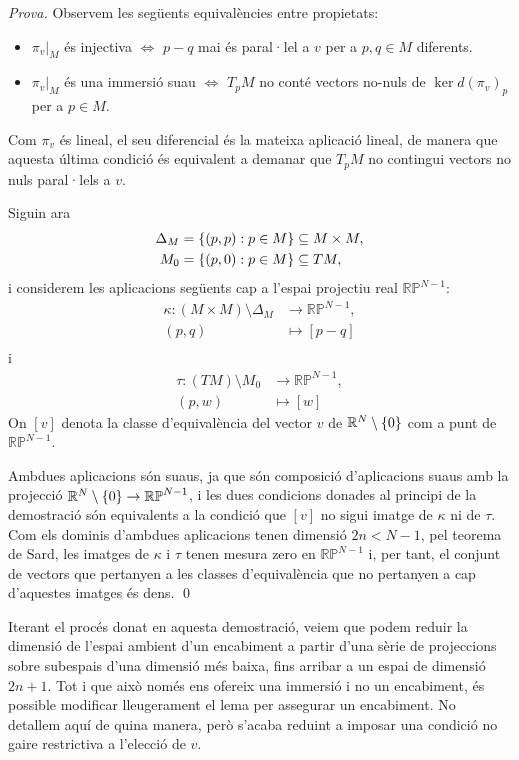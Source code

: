 {
    \color{green!50!black} 
    \textit{Prova.}
    Observem les següents equivalències entre propietats:
    \begin{itemize}
        \item $\pi_v|_M$ és injectiva $\iff$ $p-q$ mai és paral·lel a $v$ per a $p,q\in M$ diferents.
        \item $\pi_v|_M$ és una immersió suau $\iff$ $T_pM$ no conté vectors no-nuls de $\ker d(\pi_v)_p$ per a $p\in M$.
    \end{itemize}
    Com $\pi_v$ és lineal, el seu diferencial és la mateixa aplicació lineal, de manera que aquesta última condició és equivalent a demanar que $T_pM$ no contingui vectors no nuls paral·lels a $v$.

    Siguin ara
    \begin{align*}
        \Delta_M &= \{(p,p):p\in M\}\subseteq M\times M,\\
        M_0 &= \{(p,0):p\in M\}\subseteq TM,\\
    \end{align*}
    i considerem les aplicacions següents cap a l'espai projectiu real $\mathbb {RP}^{N-1}$:
    \begin{align*}
        \kappa:(M\times M)\setminus\Delta_M&\to\mathbb {RP}^{N-1},\\
        (p,q) &\mapsto [p-q]\\
    \end{align*}
    i
    \begin{align*}
        \tau:(TM)\setminus M_0&\to\mathbb {RP}^{N-1},\\
        (p,w) &\mapsto [w]
    \end{align*}
    On $[v]$ denota la classe d'equivalència del vector $v$ de $\mathbb R^N\setminus\{0\}$ com a punt de $\mathbb {RP}^{N-1}$.

    Ambdues aplicacions són suaus, ja que són composició d'aplicacions suaus amb la projecció $\mathbb R^N\setminus\{0\}\to\mathbb {RP}^{N-1}$, i les dues condicions donades al principi de la demostració són equivalents a la condició que $[v]$ no sigui imatge de $\kappa$ ni de $\tau$. Com els dominis d'ambdues aplicacions tenen dimensió $2n<N-1$, pel teorema de Sard, les imatges de $\kappa$ i $\tau$ tenen mesura zero en $\mathbb {RP}^{N-1}$ i, per tant, el conjunt de vectors que pertanyen a les classes d'equivalència que no pertanyen a cap d'aquestes imatges és dens.
    \qed
}

Iterant el procés donat en aquesta demostració, veiem que podem reduir la dimensió de l'espai ambient d'un encabiment a partir d'una sèrie de projeccions sobre subespais d'una dimensió més baixa, fins arribar a un espai de dimensió $2n+1$. Tot i que això només ens ofereix una immersió i no un encabiment, és possible modificar lleugerament el lema per assegurar un encabiment. No detallem aquí de quina manera, però s'acaba reduint a imposar una condició no gaire restrictiva a l'elecció de $v$.

